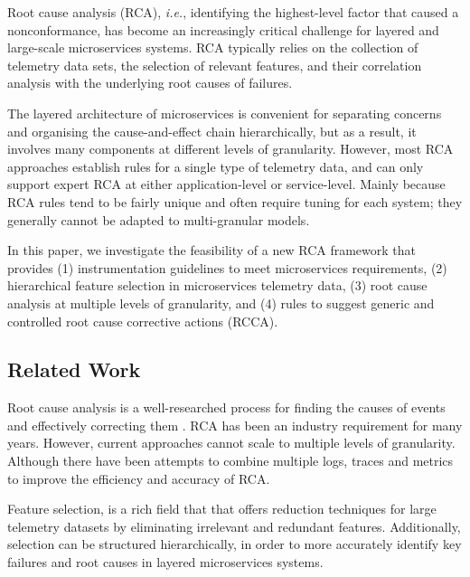 
Root cause analysis (RCA), \emph{i.e.}, identifying the highest-level factor that caused a nonconformance, has become an increasingly critical challenge for layered and large-scale microservices systems. RCA typically relies on the collection of telemetry data sets, the selection of relevant features, and their correlation analysis with the underlying root causes of failures. 

The layered architecture of microservices is convenient for separating concerns \cite{RCA} and organising the cause-and-effect chain hierarchically, but as a result, it involves many components at different levels of granularity. However, most RCA approaches establish rules for a single type of telemetry data, and can only support expert RCA at either application-level or service-level. Mainly because RCA rules tend to be fairly unique and often require tuning for each system; they generally cannot be adapted to multi-granular models.



In this paper, we investigate the feasibility of a new RCA framework that provides (1) instrumentation guidelines to meet microservices requirements, (2) hierarchical feature selection in microservices telemetry data, (3) root cause analysis at multiple levels of granularity, and (4) rules to suggest generic and controlled root cause corrective actions (RCCA).



\subsection{Related Work}

Root cause analysis is a well-researched process for finding the causes of events and effectively correcting them \cite{RCA}. RCA has been an industry requirement for many years. However, current approaches cannot scale to multiple levels of granularity. Although there have been attempts to combine multiple logs, traces and metrics to improve the efficiency and accuracy of RCA.

Feature selection, is a rich field that that offers reduction techniques for large telemetry datasets by eliminating irrelevant and redundant features. Additionally, selection can be structured hierarchically, in order to more accurately identify key failures and root causes in layered microservices systems.